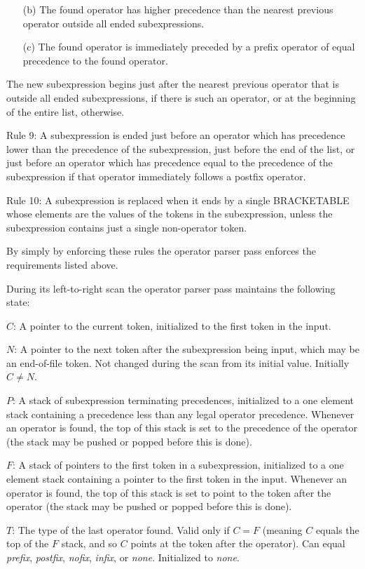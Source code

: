 \documentclass[12pt]{article}
\newenvironment{itemlist}[1][1.2in]%
	{\begin{list}{}{\setlength{\labelwidth}{#1}%
		        \setlength{\leftmargin}{\labelwidth}%
		        \addtolength{\leftmargin}{+0.2in}%
		        \renewcommand{\makelabel}[1]{##1\hfill}}}%
	{\end{list}}
\begin{document}
\begin{itemlist}[0.7in]
\begin{itemize}
\item[(b)] The found operator has higher precedence than the nearest
previous operator outside all ended subexpressions.
\item[(c)] The found operator is immediately preceded by a prefix
operator of equal precedence to the found operator.
\end{itemize}
The new subexpression begins just after the nearest previous operator
that is outside all ended subexpressions, if there is such an operator,
or at the beginning of the entire list, otherwise.
\item[Rule 9:] A subexpression is ended just before an operator
which has precedence lower than the precedence of the subexpression,
just before the end of the list, or just before an operator which
has precedence equal to the precedence of the subexpression if that
operator immediately follows a postfix operator.
\item[Rule 10:] A subexpression 
is replaced when it ends by a single BRACKETABLE whose
elements are the values of the tokens in the subexpression, unless
the subexpression contains just a single non-operator token.
\end{itemlist}

By simply by enforcing these rules the operator parser pass enforces
the requirements listed above.

During its left-to-right scan the operator parser pass maintains
the following state:
\begin{itemlist}[0.7in]
\item[$C$:] A pointer to the current token, initialized to the
first token in the input.
\item[$N$:] A pointer to the next token after the subexpression
being input, which may be an end-of-file token.  Not changed during
the scan from its initial value.  Initially $C\neq N$.
\item[$P$:] A stack of subexpression terminating precedences,
initialized to a one element stack containing a precedence less
than any legal operator precedence.  Whenever an operator is found,
the top of this stack is set to the precedence of the operator
(the stack may be pushed or popped before this is done).
\item[$F$:] A stack of pointers to the first token in a subexpression,
initialized to a one element stack containing a pointer to the first
token in the input.  Whenever an operator is found, the top of this
stack is set to point to the token after the operator (the stack
may be pushed or popped before this is done).
\item[$T$:] The type of the last operator found.  Valid only if
$C=F$ (meaning $C$ equals the top of the $F$ stack, and so $C$
points at the token after the operator).
Can equal {\em prefix}, {\em postfix}, {\em nofix}, {\em infix}, or {\em none}.
Initialized to {\em none}.
\end{itemlist}
\end{document}
